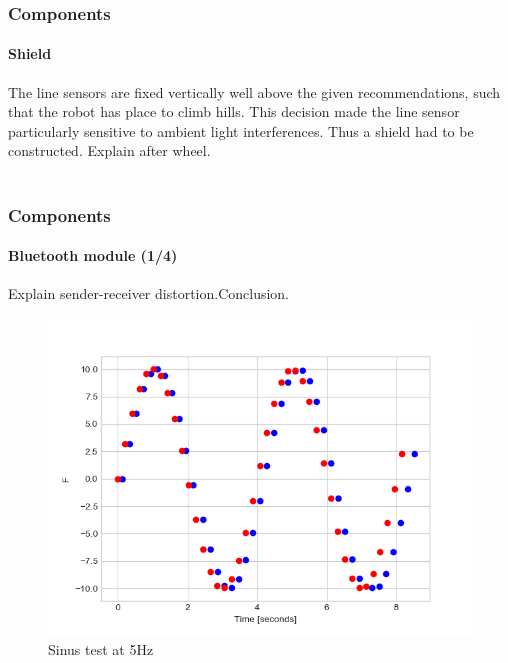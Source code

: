 \documentclass{beamer}
\begin{document}

\begin{frame}
\frametitle{Components}
\framesubtitle{Shield}
The line sensors are fixed vertically well above the given recommendations, such that the robot has place to climb hills. This decision made the line sensor 
particularly sensitive to ambient light interferences. Thus a shield had to be constructed. Explain after wheel. \\~\\
\end{frame}


\begin{frame}
\frametitle{Components}
\framesubtitle{Bluetooth module (1/4)}
Explain sender-receiver distortion.Conclusion.
\begin{figure}[hbtp]
\centering
\includegraphics[scale=0.4]{figures/sin-sending-merged-5hz.png}
\caption{Sinus test at 5Hz}
\end{figure}

\end{frame}

\end{document}
